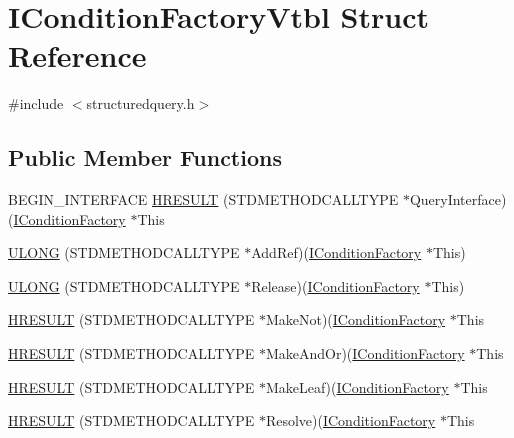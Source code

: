 \hypertarget{struct_i_condition_factory_vtbl}{}\section{I\+Condition\+Factory\+Vtbl Struct Reference}
\label{struct_i_condition_factory_vtbl}


{\ttfamily \#include $<$structuredquery.\+h$>$}

\subsection*{Public Member Functions}
\begin{DoxyCompactItemize}
\item 
B\+E\+G\+I\+N\+\_\+\+I\+N\+T\+E\+R\+F\+A\+CE \hyperlink{struct_i_condition_factory_vtbl_a87a6a2c502d751035868545f51c8511d}{H\+R\+E\+S\+U\+LT} (S\+T\+D\+M\+E\+T\+H\+O\+D\+C\+A\+L\+L\+T\+Y\+PE $\ast$Query\+Interface)(\hyperlink{structuredquery_8h_a85b31f8353e7d5dec8c14da70d6861d9}{I\+Condition\+Factory} $\ast$This
\item 
\hyperlink{struct_i_condition_factory_vtbl_ad737641b965f1872bcebd07aaa7d00dc}{U\+L\+O\+NG} (S\+T\+D\+M\+E\+T\+H\+O\+D\+C\+A\+L\+L\+T\+Y\+PE $\ast$Add\+Ref)(\hyperlink{structuredquery_8h_a85b31f8353e7d5dec8c14da70d6861d9}{I\+Condition\+Factory} $\ast$This)
\item 
\hyperlink{struct_i_condition_factory_vtbl_a152913d7dcae8796ce114b14ee18d27b}{U\+L\+O\+NG} (S\+T\+D\+M\+E\+T\+H\+O\+D\+C\+A\+L\+L\+T\+Y\+PE $\ast$Release)(\hyperlink{structuredquery_8h_a85b31f8353e7d5dec8c14da70d6861d9}{I\+Condition\+Factory} $\ast$This)
\item 
\hyperlink{struct_i_condition_factory_vtbl_ae03e53a52016158a47ba79af2d857fe3}{H\+R\+E\+S\+U\+LT} (S\+T\+D\+M\+E\+T\+H\+O\+D\+C\+A\+L\+L\+T\+Y\+PE $\ast$Make\+Not)(\hyperlink{structuredquery_8h_a85b31f8353e7d5dec8c14da70d6861d9}{I\+Condition\+Factory} $\ast$This
\item 
\hyperlink{struct_i_condition_factory_vtbl_ab8c7813f97720e88ce2033b7aa3b4071}{H\+R\+E\+S\+U\+LT} (S\+T\+D\+M\+E\+T\+H\+O\+D\+C\+A\+L\+L\+T\+Y\+PE $\ast$Make\+And\+Or)(\hyperlink{structuredquery_8h_a85b31f8353e7d5dec8c14da70d6861d9}{I\+Condition\+Factory} $\ast$This
\item 
\hyperlink{struct_i_condition_factory_vtbl_a516a4bc9bf7c2bb15a99b21f71ac4c19}{H\+R\+E\+S\+U\+LT} (S\+T\+D\+M\+E\+T\+H\+O\+D\+C\+A\+L\+L\+T\+Y\+PE $\ast$Make\+Leaf)(\hyperlink{structuredquery_8h_a85b31f8353e7d5dec8c14da70d6861d9}{I\+Condition\+Factory} $\ast$This
\item 
\hyperlink{struct_i_condition_factory_vtbl_ab646814335ade2901956d80b48730129}{H\+R\+E\+S\+U\+LT} (S\+T\+D\+M\+E\+T\+H\+O\+D\+C\+A\+L\+L\+T\+Y\+PE $\ast$Resolve)(\hyperlink{structuredquery_8h_a85b31f8353e7d5dec8c14da70d6861d9}{I\+Condition\+Factory} $\ast$This
\end{DoxyCompactItemize}
